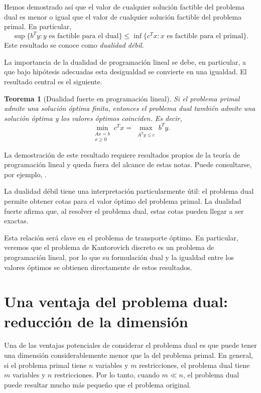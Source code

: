 \documentclass[12pt, a4paper]{amsbook}
\newtheorem{teo}{Teorema}[section]
\theoremstyle{remark}
\theoremstyle{definition}
\numberwithin{section}{chapter}
\numberwithin{subsection}{section}
\numberwithin{equation}{section}
\numberwithin{figure}{chapter}
\begin{document}
Hemos demostrado así que el valor de cualquier solución factible del
problema dual es menor o igual que el valor de cualquier solución factible
del problema primal. En particular,
\[
\sup\{b^T y:y\text{ es factible para el dual}\}
\leq
\inf\{c^T x:x\text{ es factible para el primal}\}.
\]
Este resultado se conoce como \emph{dualidad débil}.

La importancia de la dualidad de programación lineal se debe, en particular,
a que bajo hipótesis adecuadas esta desigualdad se convierte en una
igualdad. El resultado central es el siguiente.

\begin{teo}[Dualidad fuerte en programación lineal]\label{teo.PL.dualidad.fuerte}
Si el problema primal admite una solución óptima finita, entonces el problema
dual también admite una solución óptima y los valores óptimos coinciden.
Es decir,
\[
\min_{\substack{Ax=b\\x\geq0}}c^Tx
=
\max_{\substack{A^Ty\leq c}}b^Ty.
\]
\end{teo}

La demostración de este resultado requiere resultados propios de la teoría de
programación lineal y queda fuera del alcance de estas notas. Puede
consultarse, por ejemplo, \cite[Chapter 5]{Vanderbei2020}.

La dualidad débil tiene una interpretación particularmente útil: el problema
dual permite obtener cotas para el valor óptimo del problema primal. La
dualidad fuerte afirma que, al resolver el problema dual, estas cotas pueden
llegar a ser exactas.

Esta relación será clave en el problema de transporte óptimo. En
particular, veremos que el problema de Kantorovich discreto es un problema
de programación lineal, por lo que su formulación dual y la igualdad entre
los valores óptimos se obtienen directamente de estos resultados.


\section{Una ventaja del problema dual: reducción de la dimensión}

Una de las ventajas potenciales de considerar el problema dual es que puede
tener una dimensión considerablemente menor que la del problema primal. En
general, si el problema primal tiene $n$ variables y $m$ restricciones, el
problema dual tiene $m$ variables y $n$ restricciones. Por lo tanto, cuando
$m\ll n$, el problema dual puede resultar mucho más pequeño que el problema
original.
\end{document}
